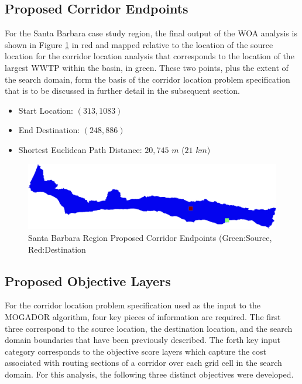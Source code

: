     \subsection{Proposed Corridor Endpoints}
    
For the Santa Barbara case study region, the final output of the WOA analysis is shown in Figure \ref{fig:SBendpoints} in red and mapped relative to the location of the source location for the corridor location analysis that corresponds to the location of the largest WWTP within the basin, in green. These two points, plus the extent of the search domain, form the basis of the corridor location problem specification that is to be discussed in further detail in the subsequent section. 
    
    \begin{itemize}
      \setlength{\itemsep}{0cm}
      \setlength{\parskip}{0cm}
        \item Start Location: $(313,1083)$
        \item End Destination: $(248,886)$   
        \item Shortest Euclidean Path Distance: $20,745$ $m$ ($21$ $km$) 
    \end{itemize}
    
        \begin{figure}[!h]
            \begin{center}
            \includegraphics[width=5.5in]{figures/SantaBarbara_Endpoints.png}   
            \caption{Santa Barbara Region Proposed Corridor Endpoints (Green:Source, Red:Destination}
            \label{fig:SBendpoints}
            \end{center}
        \end{figure}
            
    \subsection{Proposed Objective Layers}
    
For the corridor location problem specification used as the input to the MOGADOR algorithm, four key pieces of information are required. The first three correspond to the source location, the destination location, and the search domain boundaries that have been previously described. The forth key input category corresponds to the objective score layers which capture the cost associated with routing sections of a corridor over each grid cell in the search domain. For this analysis, the following three distinct objectives were developed.

